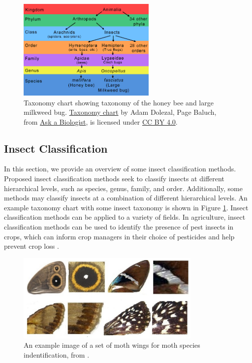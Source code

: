 \documentclass[12pt]{article}
\begin{document}
\begin{figure}[h]
    \centering
    \includegraphics[width=0.6\textwidth]{assets/images/taxonomy-milkweed-bug.png}
    \caption{Taxonomy chart showing taxonomy of the honey bee and large milkweed
        bug. \href{https://askabiologist.asu.edu/sites/default/files/resources/articles/true_bugs/taxomomy-milkweed-bug.gif}{Taxonomy chart}
        by {Adam Dolezal, Page Baluch}, from
        \href{https://askabiologist.asu.edu/explore/true-bugs}{Ask a Biologist}, is licensed under
        \href{https://creativecommons.org/licenses/by/4.0/}{CC BY 4.0}.
    }
    \label{fig:taxonomy-chart}
\end{figure}

\subsection{Insect Classification}

In this section, we provide an overview of some insect classification methods.
Proposed insect classification methods seek to classify insects at different
hierarchical levels, such as species, genus, family, and order. Additionally,
some methods may classify insects at a combination of different hierarchical
levels. An example taxonomy chart with some insect taxonomy is shown in Figure
\ref{fig:taxonomy-chart}. Insect classification methods can be applied to a
variety of fields. In agriculture, insect classification methods can be used to
identify the presence of pest insects in crops, which can inform crop
managers in their choice of pesticides and help prevent crop loss
\cite{liu_pestnet_2019, kasinathan_machine_2021}.

\begin{figure}[h]
    \centering
    \includegraphics[width=0.8\textwidth]{assets/images/moths.png}
    \caption{An example image of a set of moth wings for moth species
        indentification, from \citeauthor*{feng_automated_2013}
        \cite{feng_automated_2013}.}
    \label{fig:moths}
\end{figure}
\end{document}
